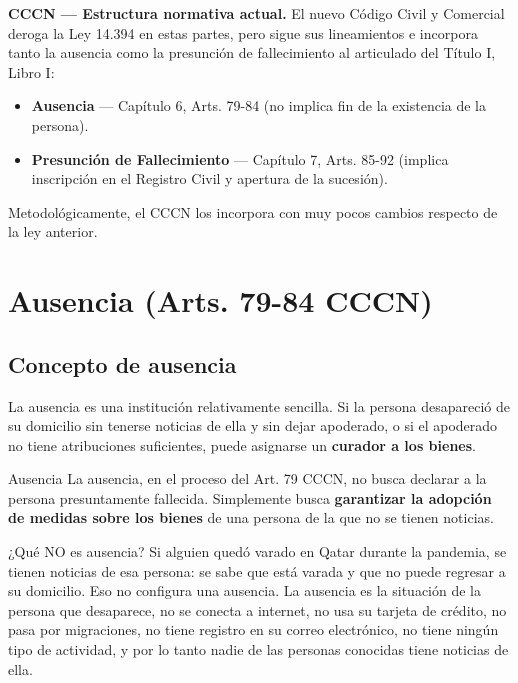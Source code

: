 \documentclass[12pt,oneside]{book}
\begin{document}
\begin{important}
\textbf{CCCN — Estructura normativa actual.} El nuevo Código Civil y
Comercial deroga la Ley 14.394 en estas partes, pero sigue sus
lineamientos e incorpora tanto la ausencia como la presunción de
fallecimiento al articulado del Título I, Libro I:
\begin{itemize}
    \item \textbf{Ausencia} — Capítulo 6, Arts. 79-84 (no implica fin de la existencia de la persona).
    \item \textbf{Presunción de Fallecimiento} — Capítulo 7, Arts. 85-92 (implica inscripción en el Registro Civil y apertura de la sucesión).
\end{itemize}
Metodológicamente, el CCCN los incorpora con muy pocos cambios respecto de
la ley anterior.
\end{important}

\chapter{Ausencia (Arts. 79-84 CCCN)}

\section{Concepto de ausencia}

La ausencia es una institución relativamente sencilla. Si la persona
desapareció de su domicilio sin tenerse noticias de ella y sin dejar
apoderado, o si el apoderado no tiene atribuciones suficientes, puede
asignarse un \textbf{curador a los bienes}.

\begin{definition}{Ausencia}
La ausencia, en el proceso del Art. 79 CCCN, no busca declarar a la
persona presuntamente fallecida. Simplemente busca \textbf{garantizar la
adopción de medidas sobre los bienes} de una persona de la que no se
tienen noticias.
\end{definition}

\begin{example}{¿Qué NO es ausencia?}
Si alguien quedó varado en Qatar durante la pandemia, se tienen noticias
de esa persona: se sabe que está varada y que no puede regresar a su
domicilio. Eso no configura una ausencia. La ausencia es la situación de
la persona que desaparece, no se conecta a internet, no usa su tarjeta de
crédito, no pasa por migraciones, no tiene registro en su correo
electrónico, no tiene ningún tipo de actividad, y por lo tanto nadie de
las personas conocidas tiene noticias de ella.
\end{example}
\end{document}
